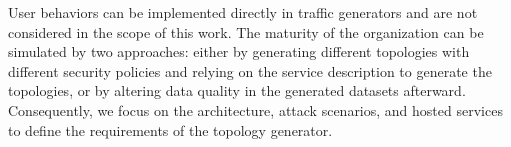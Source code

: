User behaviors can be implemented directly in traffic generators and are not considered in the scope of this work.
The maturity of the organization can be simulated by two approaches: either by generating different topologies with different security policies and relying on the service description to generate the topologies, or by altering data quality in the generated datasets afterward.
Consequently, we focus on the architecture, attack scenarios, and hosted services to define the requirements of the topology generator.

